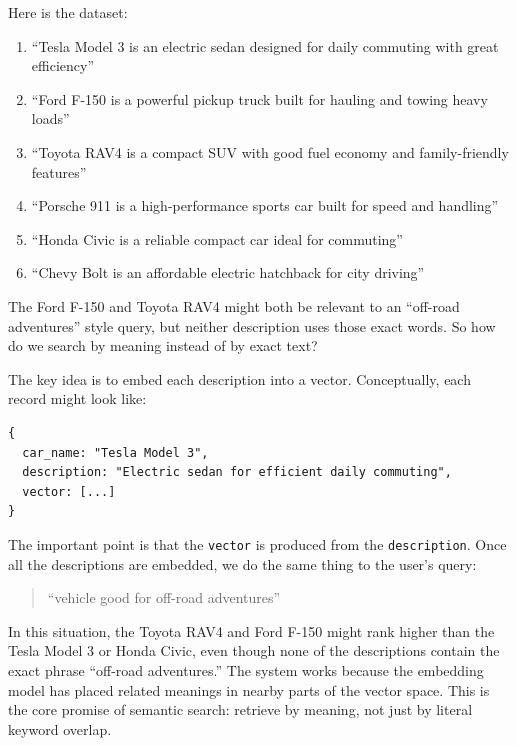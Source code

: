 \documentclass[12pt]{article}
\begin{document}
Here is the dataset:

\begin{enumerate}
    \item ``Tesla Model 3 is an electric sedan designed for daily commuting with great efficiency''
    \item ``Ford F-150 is a powerful pickup truck built for hauling and towing heavy loads''
    \item ``Toyota RAV4 is a compact SUV with good fuel economy and family-friendly features''
    \item ``Porsche 911 is a high-performance sports car built for speed and handling''
    \item ``Honda Civic is a reliable compact car ideal for commuting''
    \item ``Chevy Bolt is an affordable electric hatchback for city driving''
\end{enumerate}

The Ford F-150 and Toyota RAV4 might both be relevant to an
``off-road adventures'' style query, but neither description uses those
exact words. So how do we search by meaning instead of by exact text?

The key idea is to embed each description into a vector. Conceptually,
each record might look like:

\begin{verbatim}
{
  car_name: "Tesla Model 3",
  description: "Electric sedan for efficient daily commuting",
  vector: [...] 
}
\end{verbatim}

The important point is that the \texttt{vector} is produced from the
\texttt{description}. Once all the descriptions are embedded, we do the
same thing to the user's query:

\begin{quote}
``vehicle good for off-road adventures''
\end{quote}

In this situation, the Toyota RAV4 and Ford F-150 might rank higher than
the Tesla Model 3 or Honda Civic, even though none of the descriptions
contain the exact phrase ``off-road adventures.'' The system works because
the embedding model has placed related meanings in nearby parts of the
vector space. This is the core promise of semantic search: retrieve by
meaning, not just by literal keyword overlap.
\end{document}
